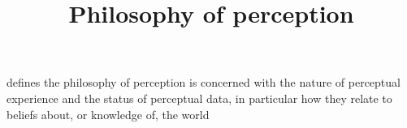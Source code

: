 \documentclass[a4paper]{article}
\title{Philosophy of perception}
\date{}
\begin{document}
\maketitle
     defines the philosophy of perception is concerned with the nature of perceptual experience and the status of perceptual data, in particular how they relate to beliefs about, or knowledge of, the world
\end{document}
